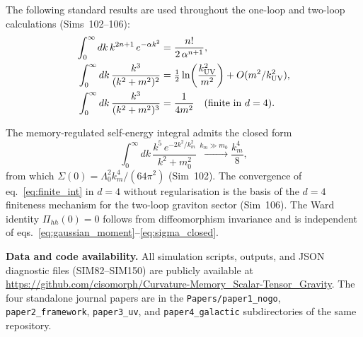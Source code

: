 \documentclass[12pt,a4paper]{article}
\begin{document}
The following standard results are used throughout the one-loop and two-loop
calculations (Sims~102--106):
\begin{align}
\int_0^\infty dk\,k^{2n+1}\,e^{-\alpha k^2}
&= \frac{n!}{2\,\alpha^{n+1}}, \label{eq:gaussian_moment}\\
\int_0^\infty dk\,\frac{k^3}{(k^2+m^2)^2}
&= \tfrac{1}{2}\ln\!\left(\frac{k_{\rm UV}^2}{m^2}\right)
   + O(m^2/k_{\rm UV}^2), \label{eq:log_int}\\
\int_0^\infty dk\,\frac{k^3}{(k^2+m^2)^3}
&= \frac{1}{4m^2}\quad\text{(finite in }d=4\text{)}. \label{eq:finite_int}
\end{align}

The memory-regulated self-energy integral admits the closed form
\begin{equation}
\int_0^\infty dk\,\frac{k^5\,e^{-2k^2/k_m^2}}{k^2+m_0^2}
\xrightarrow{k_m\gg m_0}
\frac{k_m^4}{8},
\label{eq:sigma_closed}
\end{equation}
from which $\Sigma(0)=\Lambda_0^2 k_m^4/(64\pi^2)$ (Sim~102).  The
convergence of eq.~\eqref{eq:finite_int} in $d=4$ without regularisation
is the basis of the $d=4$ finiteness mechanism for the two-loop graviton
sector (Sim~106).  The Ward identity $\Pi_{hh}(0)=0$ follows from
diffeomorphism invariance and is independent of eqs.~\eqref{eq:gaussian_moment}--\eqref{eq:sigma_closed}.

\bigskip
\noindent\textbf{Data and code availability.}
All simulation scripts, outputs, and JSON diagnostic files (SIM82--SIM150) are
publicly available at
\url{https://github.com/cisomorph/Curvature-Memory_Scalar-Tensor_Gravity}.
The four standalone journal papers are in the \texttt{Papers/paper1\_nogo},
\texttt{paper2\_framework}, \texttt{paper3\_uv}, and \texttt{paper4\_galactic}
subdirectories of the same repository.
\end{document}
